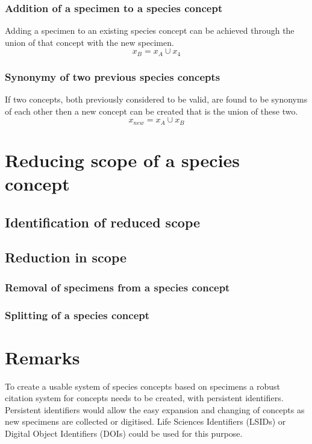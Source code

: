 \documentclass{article}
\begin{document}
   \subsubsection{Addition of a specimen to a species concept}
   Adding a specimen to an existing species concept can be achieved through the union of that concept with the new specimen.
   \[x_B = x_A \cup x_4\]
   
   \subsubsection{Synonymy of two previous species concepts}
   If two concepts, both previously considered to be valid, are found to be synonyms of each other then a new concept can be created that is the union of these two.
   \[x_{new}=x_A \cup x_B\]
   
   \section{Reducing scope of a species concept}
   \subsection{Identification of reduced scope}
   \subsection{Reduction in scope}
   \subsubsection{Removal of specimens from a species concept}
   \subsubsection{Splitting of a species concept}
   
   \section{Remarks}
   To create a usable system of species concepts based on specimens a robust citation system for concepts needs to be created, with persistent identifiers. Persistent identifiers would allow the easy expansion and changing of concepts as new specimens are collected or digitised. Life Sciences Identifiers (LSIDs) or Digital Object Identifiers (DOIs) could be used for this purpose.
   
\end{document}
